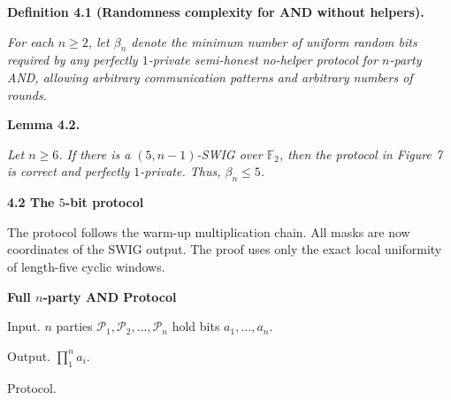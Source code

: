 \documentclass[10pt,a4paper]{article}
\begin{document}


\par\medskip\noindent\textbf{
\textbf{Definition 4.1}\textbf{ }(Randomness complexity for AND without helpers)\textbf{.}
}\par



\emph{For each $n\geq 2$, let $\beta_{n}$ denote the minimum number of uniform random bits required by any perfectly $1$-private semi-honest no-helper protocol for $n$-party AND, allowing arbitrary communication patterns and arbitrary numbers of rounds.}\par







\par\medskip\noindent\textbf{
\textbf{Lemma 4.2}\textbf{.}
}\par



\emph{Let $n\geq 6$. If there is a $(5,n-1)$-SWIG over $\mathbb{F}_{2}$, then the protocol in Figure 7 is correct and perfectly $1$-private. Thus, $\beta_{n}\leq 5$.}\par







\par\medskip\noindent\textbf{
4.2 The $5$-bit protocol}\par




The protocol follows the warm-up multiplication chain. All masks are now coordinates of the SWIG output. The proof uses only the exact local uniformity of length-five cyclic windows.\par





{\bfseries Full $n$-party AND Protocol


Input.
$n$ parties $\mathcal{P}_{1},\mathcal{P}_{2},\dots,\mathcal{P}_{n}$ hold bits $a_{1},\dots,a_{n}$. 


Output. $\prod_{1}^{n}a_{i}$.


Protocol.}\par
\end{document}
